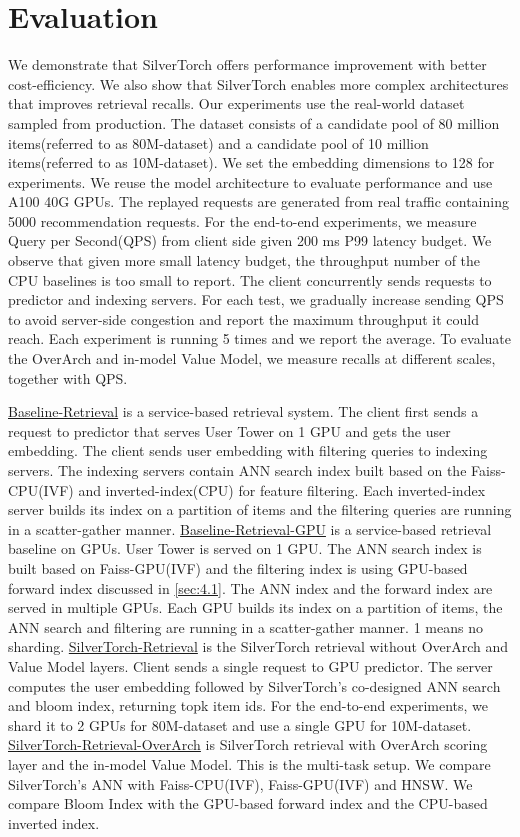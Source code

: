\section{Evaluation}
\label{sec:6}
We demonstrate that SilverTorch offers performance improvement with better cost-efficiency. We also show that SilverTorch enables more complex architectures that improves retrieval recalls. Our experiments use the real-world dataset sampled from production. The dataset consists of a candidate pool of 80 million items(referred to as 80M-dataset) and a candidate pool of 10 million items(referred to as 10M-dataset). 
We set the embedding dimensions to 128 for experiments. We reuse the model architecture to evaluate performance and use A100 40G GPUs. The replayed requests are generated from real traffic containing 5000 recommendation requests. For the end-to-end experiments, we measure Query per Second(QPS) from client side given 200 ms  P99 latency budget. We observe that given more small latency budget, the throughput number of the CPU baselines is too small to report. The client concurrently sends requests to predictor and indexing servers. For each test, we gradually increase sending QPS to avoid server-side congestion and report the maximum throughput it could reach. Each experiment is running 5 times and we report the average. To evaluate the OverArch and in-model Value Model, we measure recalls at different scales, together with QPS.

\underline{Baseline-Retrieval} is a service-based retrieval system. The client first sends a request to predictor that serves User Tower on 1 GPU and gets the user embedding. The client sends user embedding with filtering queries to indexing servers. The indexing servers contain ANN search index built based on the Faiss-CPU(IVF) and inverted-index(CPU) for feature filtering. Each inverted-index server builds its index on a partition of items and the filtering queries are running in a scatter-gather manner. \underline{Baseline-Retrieval-GPU} is a service-based retrieval baseline on GPUs. User Tower is served on 1 GPU. The ANN search index is built based on Faiss-GPU(IVF) and the filtering index is using GPU-based forward index discussed in \ref{sec:4.1}. The ANN index and the forward index are served in multiple GPUs. Each GPU builds its index on a partition of items, the ANN search and filtering are running in a scatter-gather manner. 1 means no sharding. \underline{SilverTorch-Retrieval} is the SilverTorch retrieval without OverArch and Value Model layers. Client sends a single request to GPU predictor. The server computes the user embedding followed by SilverTorch's co-designed ANN search and bloom index, returning topk item ids. For the end-to-end experiments, we shard it to 2 GPUs for 80M-dataset and use a single GPU for 10M-dataset. \underline{SilverTorch-Retrieval-OverArch} is SilverTorch retrieval with OverArch scoring layer and the in-model Value Model. This is the multi-task setup. We compare SilverTorch's ANN with Faiss-CPU(IVF), Faiss-GPU(IVF) and HNSW. We compare Bloom Index with the GPU-based forward index and the CPU-based inverted index.

